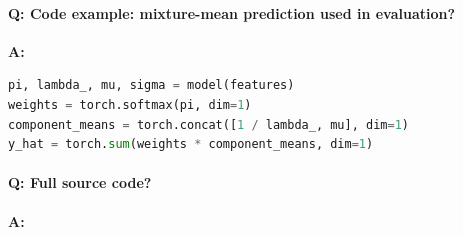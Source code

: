 \documentclass[11pt]{article}
\begin{document}
\paragraph{Q: Code example: mixture-mean prediction used in evaluation?}
\textbf{A:}
\begin{lstlisting}[language=Python]
pi, lambda_, mu, sigma = model(features)
weights = torch.softmax(pi, dim=1)
component_means = torch.concat([1 / lambda_, mu], dim=1)
y_hat = torch.sum(weights * component_means, dim=1)
\end{lstlisting}

\paragraph{Q: Full source code?}
\textbf{A:}

\end{document}
